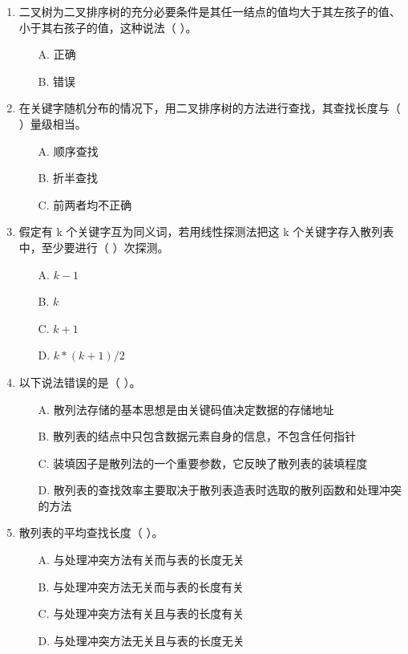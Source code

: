 \documentclass[12pt, a4paper]{article}
\begin{document}
\begin{enumerate}
    \item 二叉树为二叉排序树的充分必要条件是其任一结点的值均大于其左孩子的值、小于其右孩子的值，这种说法（ ）。
    \begin{enumerate}
        \item[A.] 正确
        \item[B.] 错误
    \end{enumerate}
    
    \item 在关键字随机分布的情况下，用二叉排序树的方法进行查找，其查找长度与（ ）量级相当。
    \begin{enumerate}
        \item[A.] 顺序查找
        \item[B.] 折半查找
        \item[C.] 前两者均不正确
    \end{enumerate}
    
    \item 假定有 k 个关键字互为同义词，若用线性探测法把这 k 个关键字存入散列表中，至少要进行（ ）次探测。
    \begin{enumerate}
        \item[A.] $k-1$
        \item[B.] $k$
        \item[C.] $k+1$
        \item[D.] $k*(k+1)/2$
    \end{enumerate}
    
    \item 以下说法错误的是（ ）。
    \begin{enumerate}
        \item[A.] 散列法存储的基本思想是由关键码值决定数据的存储地址
        \item[B.] 散列表的结点中只包含数据元素自身的信息，不包含任何指针
        \item[C.] 装填因子是散列法的一个重要参数，它反映了散列表的装填程度
        \item[D.] 散列表的查找效率主要取决于散列表造表时选取的散列函数和处理冲突的方法
    \end{enumerate}
    
    \item 散列表的平均查找长度（ ）。
    \begin{enumerate}
        \item[A.] 与处理冲突方法有关而与表的长度无关
        \item[B.] 与处理冲突方法无关而与表的长度有关
        \item[C.] 与处理冲突方法有关且与表的长度有关
        \item[D.] 与处理冲突方法无关且与表的长度无关
    \end{enumerate}
    

\end{enumerate}
\end{document}
